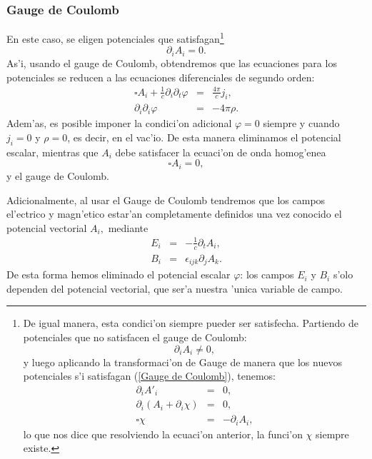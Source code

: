 \subsubsection{Gauge de Coulomb}
En este caso, se eligen potenciales que satisfagan\footnote{De igual manera,
esta condici'on siempre pueder ser satisfecha. Partiendo de potenciales que no
satisfacen el gauge de Coulomb:
\begin{equation}
\partial_{i}A_{i}\neq0 , 
\end{equation}
y luego aplicando la transformaci'on de Gauge de manera que los nuevos
potenciales s'i satisfagan (\ref{Gauge de Coulomb}), tenemos:
\begin{eqnarray}
\partial_{i}A'_{i} & = &0 ,\\
\partial_{i}\left( A_{i}+\partial_{i}\chi\right) & = &0 ,\\
\square\chi & = &-\partial_{i}A_{i},
\end{eqnarray}
lo que nos dice que resolviendo la ecuaci'on anterior, la funci'on $\chi$
siempre existe.}
\begin{equation}
\partial_{i}A_{i}=0\label{Gauge de Coulomb}.
\end{equation}
As'i, usando el gauge de Coulomb, obtendremos que las ecuaciones para
los potenciales se reducen a las ecuaciones diferenciales de segundo orden:
\begin{eqnarray}
\square A_{i}+\frac{1}{c}\partial_{i}\partial_{t}\varphi & = &\frac{4\pi}{c}
j_{i},\\
\partial_{i}\partial_{i}\varphi & = &-4\pi\rho.
\end{eqnarray}
Adem'as, es posible imponer la condici'on adicional $\varphi=0$ siempre
y cuando $j_{i}=0$ y $\rho=0$, es decir, en el vac'io. De esta
manera eliminamos el potencial escalar, mientras que $A_{i}$ debe satisfacer
la ecuaci'on de onda homog'enea
\begin{equation}
\square A_{i}=0,\label{ecuacion de Onda para Ai}
\end{equation}
y el gauge de Coulomb.

Adicionalmente, al usar el Gauge de Coulomb tendremos que los campos
el'ectrico y magn'etico estar'an completamente definidos una vez
conocido el potencial vectorial $A_{i},$ mediante
\begin{eqnarray}
E_{i} & = &-\frac{1}{c}\partial_{t}A_{i}\label{Ei(Ai)}, \\
B_{i} & = &\epsilon_{ijk}\partial_{j}A_{k}. \label{Bi(Ai)}
\end{eqnarray}
De esta forma hemos eliminado el potencial escalar $\varphi$: los campos $E_{i}$
y
$B_{i}$ s'olo dependen del potencial vectorial, que ser'a nuestra 'unica
variable de campo. 

